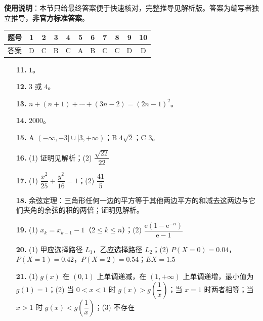 
\begin{gknotice}
\textbf{使用说明}：本节只给最终答案便于快速核对，完整推导见解析版。答案为编写者独立推导，\textbf{非官方标准答案}。
\end{gknotice}

\begin{center}\begin{tabular}{ccccccccccc}
\toprule
题号 & 1 & 2 & 3 & 4 & 5 & 6 & 7 & 8 & 9 & 10 \\
\midrule
答案 & D & C & B & C & A & B & C & C & D & D \\
\bottomrule
\end{tabular}\end{center}

\begin{itemize}[leftmargin=2.6em]
  \item[\textbf{11.}] $1$。
  \item[\textbf{12.}] $3$ 或 $4$。
  \item[\textbf{13.}] $n+(n+1)+\cdots+(3n-2)=(2n-1)^2$。
  \item[\textbf{14.}] $2000$。
  \item[\textbf{15.}] A $(-\infty,-3]\cup[3,+\infty)$；B $4\sqrt2$；C $3$。
\end{itemize}

\begin{itemize}[leftmargin=2.6em]
  \item[\textbf{16.}] (1) 证明见解析；(2) $\dfrac{\sqrt{22}}{22}$
  \item[\textbf{17.}] (1) $\dfrac{x^2}{25}+\dfrac{y^2}{16}=1$；(2) $\dfrac{41}5$
  \item[\textbf{18.}] 余弦定理：三角形任何一边的平方等于其他两边平方的和减去这两边与它们夹角的余弦的积的两倍；证明见解析。
  \item[\textbf{19.}] (1) $x_k=x_{k-1}-1$（$2\leqslant k\leqslant n$）；(2) $\dfrac{\mathrm e\left(1-\mathrm e^{-n}\right)}{\mathrm e-1}$
  \item[\textbf{20.}] (1) 甲应选择路径 $L_1$，乙应选择路径 $L_2$；(2) $P(X=0)=0.04$，$P(X=1)=0.42$，$P(X=2)=0.54$；$EX=1.5$
  \item[\textbf{21.}] (1) $g(x)$ 在 $(0,1)$ 上单调递减，在 $(1,+\infty)$ 上单调递增，最小值为 $g(1)=1$；(2) 当 $0<x<1$ 时 $g(x)>g\left(\dfrac1x\right)$；当 $x=1$ 时两者相等；当 $x>1$ 时 $g(x)<g\left(\dfrac1x\right)$；(3) 不存在
\end{itemize}
